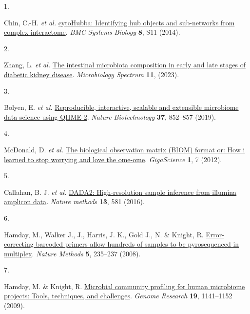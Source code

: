 \documentclass[
]{article}
\newlength{\cslhangindent}
\newlength{\csllabelwidth}
\newlength{\cslentryspacingunit} %
\newenvironment{CSLReferences}[2] %
 {%
  \setlength{\parindent}{0pt}
  \ifodd #1
  \let\oldpar\par
  \def\par{\hangindent=\cslhangindent\oldpar}
  \fi
  \setlength{\parskip}{#2\cslentryspacingunit}
 }%
 {}
\newcommand{\CSLLeftMargin}[1]{\parbox[t]{\csllabelwidth}{#1}}
\newcommand{\CSLRightInline}[1]{\parbox[t]{\linewidth - \csllabelwidth}{#1}\break}
\begin{document}
\hypertarget{refs}{}
\begin{CSLReferences}{0}{0}
\leavevmode{}%
\CSLLeftMargin{1. }%
\CSLRightInline{Chin, C.-H. \emph{et al.} \href{https://doi.org/10.1186/1752-0509-8-S4-S11}{cytoHubba: Identifying hub objects and sub-networks from complex interactome}. \emph{BMC Systems Biology} \textbf{8}, S11 (2014).}

\leavevmode{}%
\CSLLeftMargin{2. }%
\CSLRightInline{Zhang, L. \emph{et al.} \href{https://doi.org/10.1128/spectrum.00382-23}{The intestinal microbiota composition in early and late stages of diabetic kidney disease}. \emph{Microbiology Spectrum} \textbf{11}, (2023).}

\leavevmode{}%
\CSLLeftMargin{3. }%
\CSLRightInline{Bolyen, E. \emph{et al.} \href{https://doi.org/10.1038/s41587-019-0209-9}{Reproducible, interactive, scalable and extensible microbiome data science using QIIME 2}. \emph{Nature Biotechnology} \textbf{37}, 852--857 (2019).}

\leavevmode{}%
\CSLLeftMargin{4. }%
\CSLRightInline{McDonald, D. \emph{et al.} \href{https://doi.org/10.1186/2047-217X-1-7}{The biological observation matrix (BIOM) format or: How i learned to stop worrying and love the ome-ome}. \emph{GigaScience} \textbf{1}, 7 (2012).}

\leavevmode{}%
\CSLLeftMargin{5. }%
\CSLRightInline{Callahan, B. J. \emph{et al.} \href{https://doi.org/10.1038/nmeth.3869}{DADA2: High-resolution sample inference from illumina amplicon data}. \emph{Nature methods} \textbf{13}, 581 (2016).}

\leavevmode{}%
\CSLLeftMargin{6. }%
\CSLRightInline{Hamday, M., Walker J., J., Harris, J. K., Gold J., N. \& Knight, R. \href{https://doi.org/10.1038/nmeth.1184}{Error-correcting barcoded primers allow hundreds of samples to be pyrosequenced in multiplex}. \emph{Nature Methods} \textbf{5}, 235--237 (2008).}

\leavevmode{}%
\CSLLeftMargin{7. }%
\CSLRightInline{Hamday, M. \& Knight, R. \href{https://doi.org/10.1101/gr.085464.108}{Microbial community profiling for human microbiome projects: Tools, techniques, and challenges}. \emph{Genome Research} \textbf{19}, 1141--1152 (2009).}


\end{CSLReferences}
\end{document}
